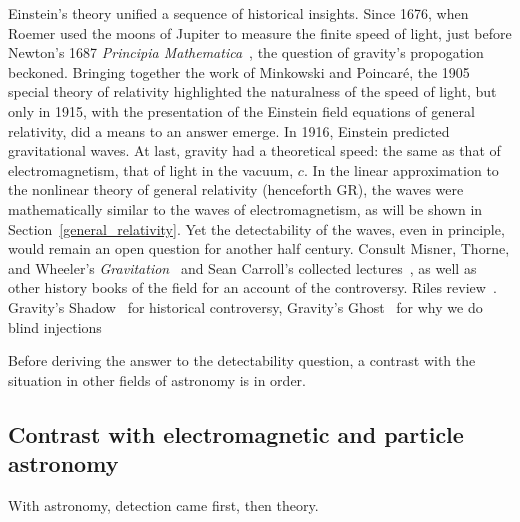         Einstein's theory unified a sequence of historical insights. Since 1676, when Roemer used the moons of Jupiter to measure the finite speed of light, just before Newton's 1687 \textit{Principia Mathematica}~\cite{Hawking2002}, the question of gravity's propogation beckoned. 
Bringing together the work of Minkowski and Poincar\'{e}, the 1905 special theory of relativity highlighted the naturalness of the speed of light, but only in 1915, with the presentation of the Einstein field equations of general relativity, did a means to an answer emerge. 
In 1916, Einstein predicted gravitational waves. 
At last, gravity had a theoretical speed: the same as that of electromagnetism, that of light in the vacuum, $c$.
In the linear approximation to the nonlinear theory of general relativity (henceforth GR), the waves were mathematically similar to the waves of electromagnetism, as will be shown in Section~\ref{general_relativity}.
Yet the detectability of the waves, even in principle, would remain an open question for another half century. 
Consult Misner, Thorne, and Wheeler's \textit{Gravitation}~\cite{MisnerThorneWheeler} and Sean Carroll's collected lectures~\cite{Carroll1997}, as well as other history books of the field for an account of the controversy.
Riles review~\cite{Riles2013}.
Gravity's Shadow~\cite{CollinsGravityShadow} for historical controversy,
Gravity's Ghost~\cite{CollinsGravityGhost} for why we do blind injections

Before deriving the answer to the detectability question, a contrast with the situation in other fields of astronomy is in order.

 
        \subsection{Contrast with electromagnetic and particle astronomy}
        \label{contrast_astro}

        With astronomy, detection came first, then theory.

